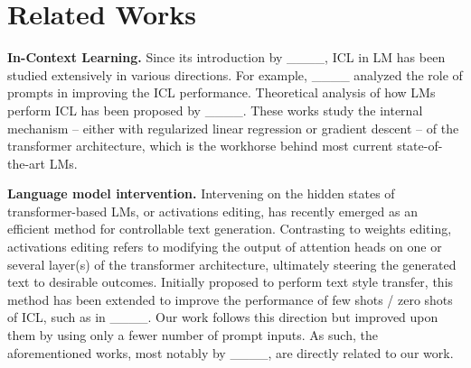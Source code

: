 \section{Related Works}
\textbf{In-Context Learning.} Since its introduction by ____, ICL in LM has been studied extensively in various directions. For example, ____ analyzed the role of prompts in improving the ICL performance. Theoretical analysis of how LMs perform ICL has been proposed by ____. These works study the internal mechanism -- either with regularized linear regression or gradient descent -- of the transformer architecture, which is the workhorse behind most current state-of-the-art LMs. 

\textbf{Language model intervention.} Intervening on the hidden states of transformer-based LMs, or activations editing, has recently emerged as an efficient method for controllable text generation. Contrasting to weights editing, activations editing refers to modifying the output of attention heads on one or several layer(s) of the transformer architecture, ultimately steering the generated text to desirable outcomes. Initially proposed to perform text style transfer, this method has been extended to improve the performance of few shots / zero shots of ICL, such as in ____. Our work follows this direction but improved upon them by using only a fewer number of prompt inputs. As such, the aforementioned works, most notably by ____, are directly related to our work.
